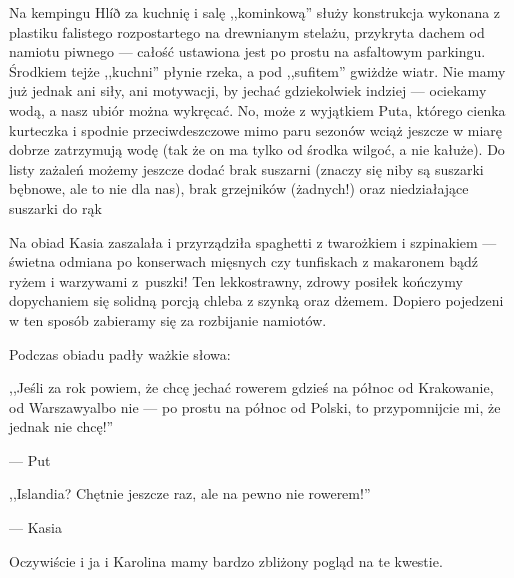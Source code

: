 Na kempingu Hlíð za kuchnię i salę ,,kominkową'' służy konstrukcja wykonana z plastiku falistego rozpostartego na drewnianym stelażu, przykryta dachem od namiotu piwnego --- całość ustawiona jest po prostu na asfaltowym parkingu. Środkiem tejże ,,kuchni'' płynie rzeka, a pod ,,sufitem'' gwiżdże wiatr. Nie mamy już jednak ani siły, ani motywacji, by jechać gdziekolwiek indziej --- ociekamy wodą, a nasz ubiór można wykręcać. No, może z wyjątkiem Puta, którego cienka kurteczka i spodnie przeciwdeszczowe mimo paru sezonów wciąż jeszcze w miarę dobrze zatrzymują wodę (tak że on ma tylko od środka wilgoć, a nie kałuże). Do listy zażaleń możemy jeszcze dodać brak suszarni (znaczy się niby są suszarki bębnowe, ale to nie dla nas), brak grzejników (żadnych!) oraz niedziałające suszarki do rąk\textellipsis

Na obiad Kasia zaszalała i przyrządziła spaghetti z twarożkiem i szpinakiem --- świetna odmiana po konserwach mięsnych czy tunfiskach z makaronem bądź ryżem i warzywami z~puszki! Ten lekkostrawny, zdrowy posiłek kończymy dopychaniem się solidną porcją chleba z szynką oraz dżemem. Dopiero pojedzeni w ten sposób zabieramy się za rozbijanie namiotów.


\medskip

Podczas obiadu padły ważkie słowa:

\vspace{-1em}

\epigraph{,,Jeśli za rok powiem, że chcę jechać rowerem gdzieś na północ od Krakowa\textellipsis nie, od Warszawy\textellipsis albo nie --- po prostu na północ od Polski, to przypomnijcie mi, że jednak nie chcę!''}{--- \textup{Put}}

\vspace{-2em}

\epigraph{,,Islandia? Chętnie jeszcze raz, ale na pewno nie rowerem!''}{--- \textup{Kasia}}

\vspace{-1em}

\noindent Oczywiście i ja i Karolina mamy bardzo zbliżony pogląd na te kwestie.

\vfill


\vfill

